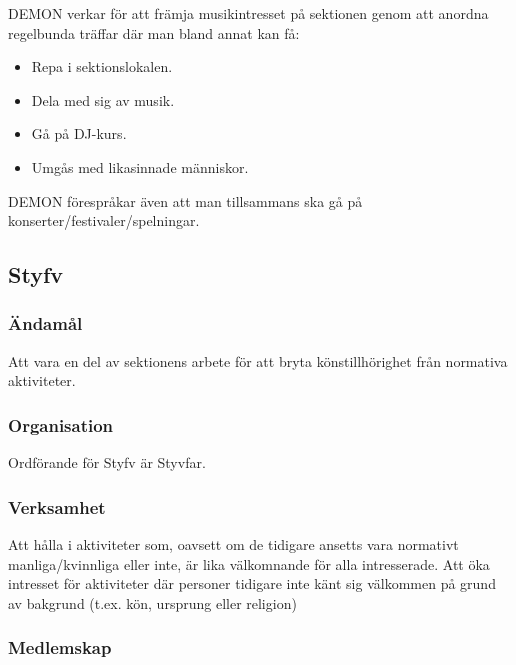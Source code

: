 \documentclass{dgovdoc}
\begin{document}
DEMON verkar för att främja musikintresset på sektionen genom att anordna
regelbunda träffar där man bland annat kan få:

\begin{itemize}
\item Repa i sektionslokalen.
\item Dela med sig av musik.
\item Gå på DJ-kurs.
\item Umgås med likasinnade människor.
\end{itemize}

DEMON förespråkar även att man tillsammans ska gå på
konserter/festivaler/spelningar.

\subsection{Styfv}

\subsubsection{Ändamål}

Att vara en del av sektionens arbete för att bryta könstillhörighet från normativa aktiviteter.

\subsubsection{Organisation}

Ordförande för Styfv är Styvfar.

\subsubsection{Verksamhet}

Att hålla i aktiviteter som, oavsett om de tidigare ansetts vara normativt manliga/kvinnliga eller inte, är lika välkomnande för alla intresserade. Att öka intresset för aktiviteter där personer tidigare inte känt sig välkommen på grund av bakgrund (t.ex. kön, ursprung eller religion)

\subsubsection{Medlemskap}
\end{document}
